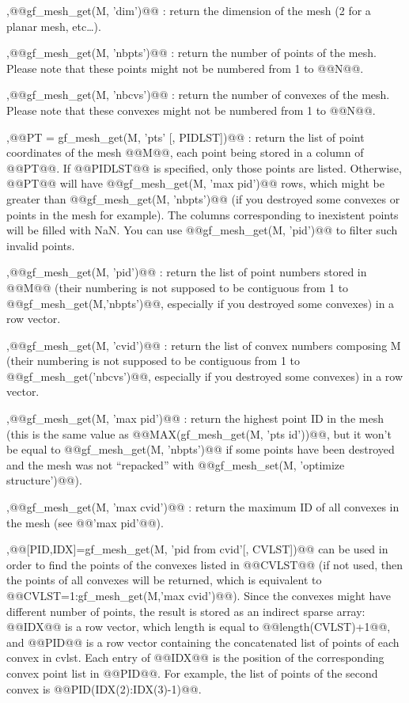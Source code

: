 \begin{cmddescription}
  \sep{@@gf\_mesh\_get(M, 'dim')@@} : return the dimension of the
  mesh (2 for a planar mesh, etc\ldots).
  
  \sep{@@gf\_mesh\_get(M, 'nbpts')@@} : return the number of
  points of the mesh. Please note that these points might not be
  numbered from 1 to @@N@@.
  
  \sep{@@gf\_mesh\_get(M, 'nbcvs')@@} : return the number of
  convexes of the mesh. Please note that these convexes might not be
  numbered from 1 to @@N@@.
  
  \sep{@@PT = gf\_mesh\_get(M, 'pts' [, PIDLST])@@} : return the list of
  point coordinates of the mesh @@M@@, each point being stored in a
  column of @@PT@@. If @@PIDLST@@ is specified, only those points are
  listed. Otherwise, @@PT@@ will have @@gf\_mesh\_get(M, 'max pid')@@
  rows, which might be greater than @@gf\_mesh\_get(M, 'nbpts')@@ (if
  you destroyed some convexes or points in the mesh for example). The
  columns corresponding to inexistent points will be filled with NaN.
  You can use @@gf\_mesh\_get(M, 'pid')@@ to filter such invalid points.
  
  \sep{@@gf\_mesh\_get(M, 'pid')@@}  : return the list of point
  numbers stored in @@M@@ (their numbering is not supposed to be
  contiguous from 1 to @@gf\_mesh\_get(M,'nbpts')@@, especially if you
  destroyed some convexes) in a row vector.
  
  \sep{@@gf\_mesh\_get(M, 'cvid')@@}  : return the list of
  convex numbers composing M (their numbering is not supposed to be
  contiguous from 1 to @@gf\_mesh\_get('nbcvs')@@, especially if you
  destroyed some convexes) in a row vector.
  
  \sep{@@gf\_mesh\_get(M, 'max pid')@@} : return the highest point ID in
  the mesh (this is the same value as @@MAX(gf\_mesh\_get(M, 'pts
  id'))@@, but it won't be equal to @@gf\_mesh\_get(M, 'nbpts')@@ if
  some points have been destroyed and the mesh was not ``repacked''
  with @@gf\_mesh\_set(M, 'optimize structure')@@).

  \sep{@@gf\_mesh\_get(M, 'max cvid')@@} : 
  return the maximum ID of all convexes in the mesh (see @@'max pid'@@).
  
  \sep{@@[PID,IDX]=gf\_mesh\_get(M, 'pid from cvid'[, CVLST])@@} 
can be used in order to find the points of the
  convexes listed in @@CVLST@@ (if not used, then the points of all
  convexes will be returned, which is equivalent to @@CVLST=1:gf\_mesh\_get(M,'max cvid')@@). Since the convexes might have different
  number of points, the result is stored as an indirect sparse array: 
  @@IDX@@ is a row vector, which length is equal to @@length(CVLST)+1@@, and
  @@PID@@ is a row vector containing the concatenated
  list of points of each convex in cvlst. Each entry of @@IDX@@ is the
  position of the corresponding convex point list in @@PID@@. For
  example, the list of points of the second convex is
  @@PID(IDX(2):IDX(3)-1)@@.
  

\end{cmddescription}
